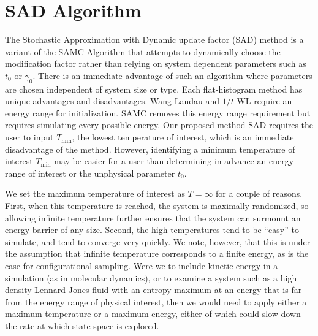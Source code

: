 \documentclass[letterpaper,twocolumn,amsmath,amssymb,pre,aps,10pt]{revtex4-1}
\begin{document}
\section{SAD Algorithm}\label{sec:sad}
The Stochastic Approximation with Dynamic update factor (SAD) method
is a variant of the SAMC Algorithm that attempts to dynamically choose
the modification factor rather than relying on system dependent
parameters such as $t_0$ or $\gamma_0$.  There is an immediate
advantage of such an algorithm where parameters are chosen independent
of system size or type. Each flat-histogram method has unique
advantages and disadvantages.  Wang-Landau and $1/t$-WL require an
energy range for initialization.  SAMC removes this energy range
requirement but requires simulating every possible energy. Our
proposed method SAD requires the user to input $T_\text{min}$, the
lowest temperature of interest, which is an immediate disadvantage of
the method. However, identifying a minimum temperature of interest
$T_\text{min}$ may be easier for a user than determining in advance
an energy range of interest or the unphysical parameter $t_0$.

We set the maximum temperature of interest as $T=\infty$ for a couple
of reasons.  First, when this temperature is reached, the system is
maximally randomized, so allowing infinite temperature further ensures
that the system can surmount an energy barrier of any size.  Second,
the high temperatures tend to be ``easy'' to simulate, and tend to
converge very quickly.  We note, however, that this is under the
assumption that infinite temperature corresponds to a finite energy,
as is the case for configurational sampling.  Were we to include
kinetic energy in a simulation (as in molecular dynamics), or to
examine a system such as a high density Lennard-Jones fluid with an
entropy maximum at an energy that is far from the energy range of
physical interest, then we would need to apply either a maximum
temperature or a maximum energy, either of which could slow down the
rate at which state space is explored.

\end{document}
